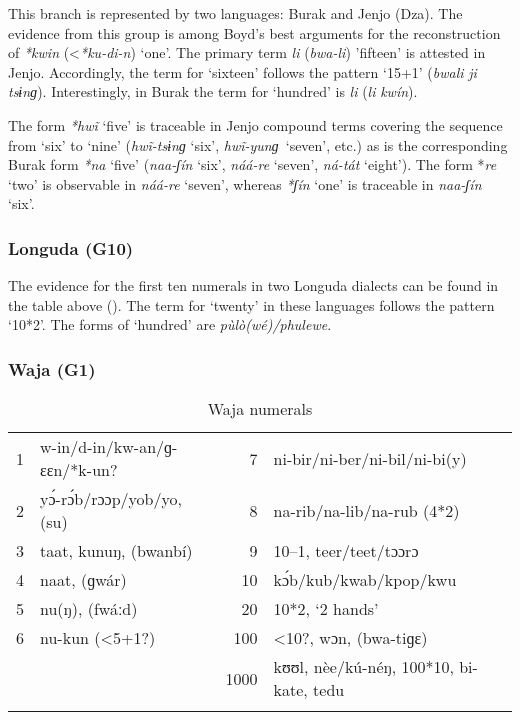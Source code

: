 This branch is represented by two languages: Burak and Jenjo (Dza). The evidence from this group is among Boyd’s best arguments for the reconstruction of \textit{*kwin} (<\textit{*ku-di-n}) ‘one’. The primary term \textit{li} (\textit{bwa-li}) ’fifteen’ is attested in Jenjo. Accordingly, the term for ‘sixteen’ follows the pattern ‘15+1’ (\textit{bwali} \textit{ji} \textit{tsɨnɡ}). Interestingly, in Burak the term for ‘hundred’ is \textit{li} (\textit{li} \textit{kwín}).

The form \textit{*hw{\~{i}}} ‘five’ is traceable in Jenjo compound terms covering the sequence from ‘six’ to ‘nine’ (\textit{hw{\~{i}}-tsɨnɡ} ‘six’, \textit{hw{\~{i}}-yunɡ}~‘seven’, etc.) as is the corresponding Burak form \textit{*na} ‘five’ (\textit{naa-ʃín} ‘six’, \textit{náá-re} ‘seven’, \textit{ná-tát} ‘eight’). The form *\textit{re} ‘two’ is observable in \textit{náá-re} ‘seven’, whereas \textit{*ʃín} ‘one’ is traceable in \textit{naa-ʃín} ‘six’.

\subsubsection{Longuda (G10)}%
The evidence for the first ten numerals in two Longuda dialects can be found in the table above (). The term for ‘twenty’ in these languages follows the pattern ‘10*2’.  The forms of ‘hundred’ are \textit{p{\`{u}}lò(wé)/phulewe}.

\subsubsection{Waja (G1)}%
\begin{table}
\caption{\label{tab:3:114}Waja numerals}


\begin{tabularx}{\textwidth}{llrX}
\lsptoprule

1 & w-in/d-in/kw-an/ɡ-ɛɛn/*k-un? & 7 & ni-bir/ni-ber/ni-bil/ni-bi(y)\\
2 & y{\'{ɔ}}-r{\'{ɔ}}b/rɔɔp/yob/yo, (su) & 8 & na-rib/na-lib/na-rub (4*2)\\
3 & taat, kunuŋ, (bwanbí) & 9 & 10--1, teer/teet/tɔɔrɔ\\
4 & naat, (ɡwár) & 10 & k{\'{ɔ}}b/kub/kwab/kpop/kwu\\
5 & nu(ŋ), (fwáːd) & 20 & 10*2, `2 hands'\\
6 & nu-kun (<5+1?) & 100 & <10?, wɔn, (bwa-tiɡɛ)\\
&  & 1000 & kʊʊl, nèe/kú-néŋ, 100*10, bi-kate, tedu\\
\lspbottomrule
\end{tabularx}
\end{table}

